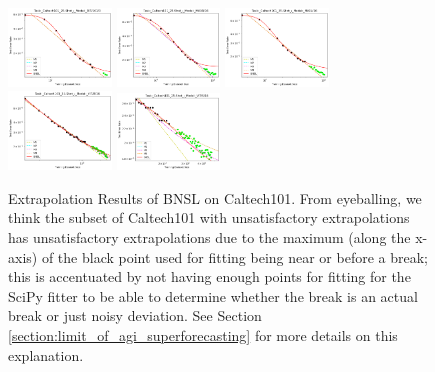 \documentclass{article} %
\begin{document}
\begin{figure}
\includegraphics[width=0.245\textwidth]{figures/scaling_laws_benchmark_dataset_plots__all_functional_forms/caltech_25shot___BiT_101_3.png}
\includegraphics[width=0.245\textwidth]{figures/scaling_laws_benchmark_dataset_plots__all_functional_forms/caltech_25shot___MiX_B_16.png}
\includegraphics[width=0.245\textwidth]{figures/scaling_laws_benchmark_dataset_plots__all_functional_forms/caltech_25shot___MiX_L_16.png}
\includegraphics[width=0.245\textwidth]{figures/scaling_laws_benchmark_dataset_plots__all_functional_forms/caltech_25shot___ViT_B_16.png}
\includegraphics[width=0.245\textwidth]{figures/scaling_laws_benchmark_dataset_plots__all_functional_forms/caltech_25shot___ViT_S_16.png}

    \caption{
    Extrapolation Results of BNSL on Caltech101. From eyeballing, we think the subset of Caltech101 with unsatisfactory extrapolations has unsatisfactory extrapolations due to the maximum (along the x-axis) of the black point used for fitting being near or before a break; this is accentuated by not having enough points for fitting for the SciPy fitter to be able to determine whether the break is an actual break or just noisy deviation. See Section \ref{section:limit_of_agi_superforecasting} for more details on this explanation.
    }
    \label{fig:scaling_laws_benchmark_dataset_all_extrapolations__caltech}
\end{figure}
\end{document}
